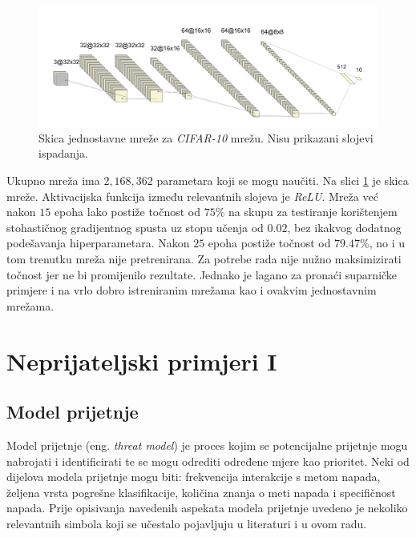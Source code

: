 \documentclass[utf8, diplomski]{fer}
\begin{document}
\begin{figure}[H]
\centering
\includegraphics[width=1\textwidth,keepaspectratio]{img/other/toy_cifar10.png}
\caption{Skica jednostavne mreže za \textit{CIFAR-10} mrežu. Nisu prikazani slojevi ispadanja.}
\label{fig:toy_cifar10}
\end{figure}

Ukupno mreža ima $2,168,362$ parametara koji se mogu naučiti. Na slici \ref{fig:toy_cifar10} je skica mreže. Aktivacijska funkcija između relevantnih slojeva je \textit{ReLU}. Mreža već nakon $15$ epoha lako postiže točnost od $75\%$ na skupu za testiranje korištenjem stohastičnog gradijentnog spusta uz stopu učenja od $0.02$, bez ikakvog dodatnog podešavanja hiperparametara. Nakon $25$ epoha postiže točnost od $79.47\%$, no i u tom trenutku mreža nije pretrenirana. Za potrebe rada nije nužno maksimizirati točnost jer ne bi promijenilo rezultate. Jednako je lagano za pronaći suparničke primjere i na vrlo dobro istreniranim mrežama kao i ovakvim jednostavnim mrežama.


\chapter{Neprijateljski primjeri I}
\section{Model prijetnje}
Model prijetnje (eng. \textit{threat model}) je proces kojim se potencijalne prijetnje mogu nabrojati i identificirati te se mogu odrediti određene mjere kao prioritet. Neki od dijelova modela prijetnje mogu biti: frekvencija interakcije s metom napada, željena vrsta pogrešne klasifikacije, količina znanja o meti napada i specifičnost napada. Prije opisivanja navedenih aspekata modela prijetnje uvedeno je nekoliko relevantnih simbola koji se učestalo pojavljuju u literaturi i u ovom radu.
\end{document}
